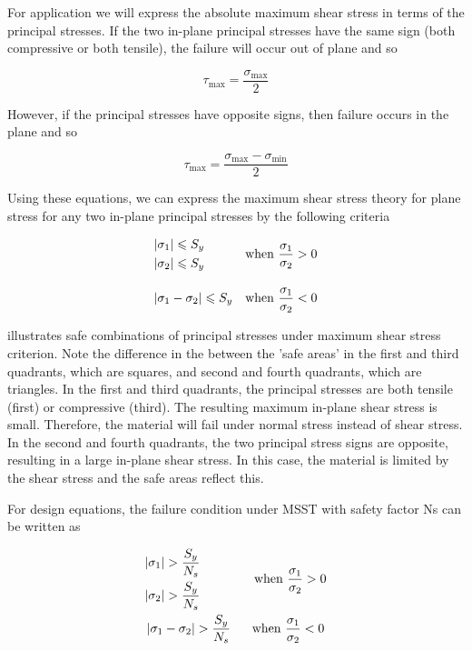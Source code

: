 \documentclass[a4paper,openany,nobib]{tufte-book}
\begin{document}
For application we will express the absolute maximum shear stress in
terms of the principal stresses. If the two in-plane principal stresses
have the same sign (both compressive or both tensile), the failure will
occur out of plane and so

$$\tau _{\max } = \frac{\sigma _{\max }}{2}$$

However, if the principal stresses have opposite signs, then failure
occurs in the plane and so

$$\tau _{\max } = \frac{\sigma_{\max } - \sigma _{\min }}{2}$$

Using these equations, we can express the maximum shear stress theory
for plane stress for any two in-plane principal stresses by the
following criteria

$$\begin{array}{l l}
    \begin{gathered}
      \left| \sigma_1 \right| \leqslant S_y \hfill \\
      \left| \sigma_2 \right| \leqslant S_y \hfill \\ 
    \end{gathered}  &\text{when } \dfrac{\sigma _1}{\sigma _2} > 0  \\[20pt]
    \left| \sigma _1 - \sigma _2 \right| \leqslant S_y &\text{when } \dfrac{\sigma _1}{\sigma _2} < 0 \\ 
  \end{array}$$


illustrates safe combinations of principal stresses under maximum shear
stress criterion. Note the difference in the between the 'safe areas' in
the first and third quadrants, which are squares, and second and fourth
quadrants, which are triangles. In the first and third quadrants, the
principal stresses are both tensile (first) or compressive (third). The
resulting maximum in-plane shear stress is small. Therefore, the
material will fail under normal stress instead of shear stress. In the
second and fourth quadrants, the two principal stress signs are
opposite, resulting in a large in-plane shear stress. In this case, the
material is limited by the shear stress and the safe areas reflect this.

For design equations, the failure condition under MSST with safety
factor Ns can be written as

$$\begin{gathered}
    \begin{gathered}
        \left| \sigma_1 \right| > \frac{S_y}{N_s} \\
        \left| \sigma_2 \right| > \frac{S_y}{N_s}  \\ 
      \end{gathered}  \hspace{1.5cm} \text{when } \dfrac{\sigma _1}{\sigma _2} > 0 \\
      \left| {\sigma _1} - {\sigma _2} \right| > \frac{S_y}{N_s} \hspace{0.6cm} \text{when } \dfrac{\sigma_1}{\sigma_2} < 0
  \end{gathered}$$
\end{document}
